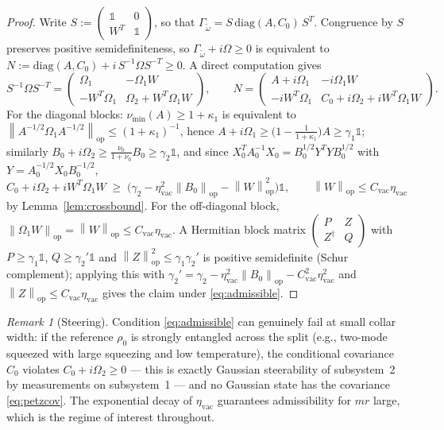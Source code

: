 \documentclass[11pt,a4paper]{article}
\newcommand{\idm}{\mathds{1}}}{\newcommand{\idm}{\mathbf{1}}}
\theoremstyle{plain}
\theoremstyle{definition}
\theoremstyle{remark}
\newtheorem{remark}[theorem]{Remark}
\newcommand{\opnorm}[1]{\left\lVert #1 \right\rVert_{\mathrm{op}}}
\newcommand{\etavac}{\eta_{\mathrm{vac}}}
\newcommand{\Cvac}{C_{\mathrm{vac}}}
\begin{document}
\begin{proof}
Write $S := \begin{pmatrix} \idm & 0 \\ W^T & \idm \end{pmatrix}$, so that
$\Gamma_{\tilde{\omega}} = S\,\mathrm{diag}(A, C_0)\,S^T$. Congruence by $S$
preserves positive semidefiniteness, so $\Gamma_{\tilde{\omega}} + i\Omega \ge 0$
is equivalent to $N := \mathrm{diag}(A, C_0) + i\,S^{-1}\Omega S^{-T} \ge 0$.
A direct computation gives
\begin{equation}
S^{-1}\Omega S^{-T} =
\begin{pmatrix} \Omega_1 & -\Omega_1 W \\ -W^T\Omega_1 & \Omega_2 + W^T\Omega_1 W
\end{pmatrix},
\qquad
N = \begin{pmatrix} A + i\Omega_1 & -i\Omega_1 W \\
-iW^T\Omega_1 & C_0 + i\Omega_2 + iW^T\Omega_1 W \end{pmatrix}.
\end{equation}
For the diagonal blocks: $\nu_{\min}(A) \ge 1+\kappa_1$ is equivalent to
$\opnorm{A^{-1/2}\Omega_1 A^{-1/2}} \le (1+\kappa_1)^{-1}$, hence
$A + i\Omega_1 \ge \big(1 - \tfrac{1}{1+\kappa_1}\big)A \ge \gamma_1 \idm$;
similarly $B_0 + i\Omega_2 \ge \tfrac{\nu_0}{1+\nu_0}B_0 \ge \gamma_2\idm$, and
since $X_0^T A_0^{-1} X_0 = B_0^{1/2}Y^TYB_0^{1/2}$ with
$Y = A_0^{-1/2}X_0B_0^{-1/2}$,
\begin{equation}
C_0 + i\Omega_2 + iW^T\Omega_1 W \;\ge\;
\big(\gamma_2 - \etavac^2\opnorm{B_0} - \opnorm{W}^2\big)\idm,
\qquad \opnorm{W} \le \Cvac\etavac
\end{equation}
by Lemma~\ref{lem:crossbound}. For the off-diagonal block,
$\opnorm{\Omega_1 W} = \opnorm{W} \le \Cvac\etavac$. A Hermitian block matrix
$\begin{pmatrix} P & Z \\ Z^\dagger & Q\end{pmatrix}$ with $P \ge \gamma_1\idm$,
$Q \ge \gamma_2'\idm$ and $\opnorm{Z}^2 \le \gamma_1\gamma_2'$ is positive
semidefinite (Schur complement); applying this with
$\gamma_2' = \gamma_2 - \etavac^2\opnorm{B_0} - \Cvac^2\etavac^2$ and
$\opnorm{Z} \le \Cvac\etavac$ gives the claim under \eqref{eq:admissible}.
\end{proof}

\begin{remark}[Steering]\label{rem:steering}
Condition \eqref{eq:admissible} can genuinely fail at small collar width: if the
reference $\rho_0$ is strongly entangled across the split (e.g., two-mode squeezed
with large squeezing and low temperature), the conditional covariance $C_0$
violates $C_0 + i\Omega_2 \ge 0$ --- this is exactly Gaussian steerability of
subsystem~2 by measurements on subsystem~1 --- and no Gaussian state has the
covariance \eqref{eq:petzcov}. The exponential decay of $\etavac$ guarantees
admissibility for $mr$ large, which is the regime of interest throughout.
\end{remark}
\end{document}
